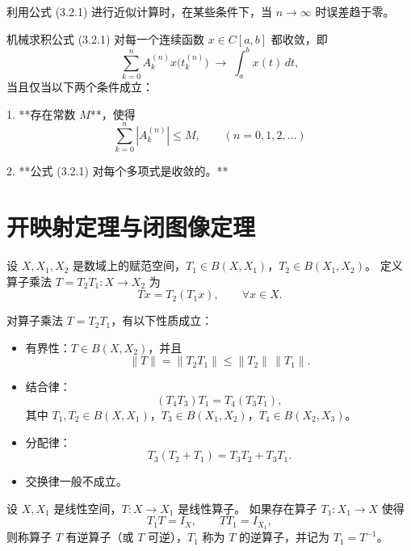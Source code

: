 \begin{theorem}[机械求积公式的收敛性问题]
利用公式 (3.2.1) 进行近似计算时，在某些条件下，当 $n \to \infty$ 时误差趋于零。

机械求积公式 (3.2.1) 对每一个连续函数 $x \in C[a,b]$ 都收敛，即
\[
\sum_{k=0}^{n} A_k^{(n)} x\bigl(t_k^{(n)}\bigr)
\;\longrightarrow\;
\int_a^b x(t)\, dt,
\]
当且仅当以下两个条件成立：

1. **存在常数 $M$**，使得
\[
\sum_{k=0}^n \left|A_k^{(n)}\right| \le M, \qquad (n = 0,1,2,\ldots)
\]

2. **公式 (3.2.1) 对每个多项式是收敛的。**

\end{theorem}
\section{开映射定理与闭图像定理}
\begin{definition}
设 $X, X_1, X_2$ 是数域上的赋范空间，$T_1 \in B(X, X_1)$，$T_2 \in B(X_1, X_2)$。
定义算子乘法 $T = T_2 T_1 : X \to X_2$ 为
\[
T x = T_2(T_1 x), \qquad \forall x \in X.
\]
\end{definition}

\begin{theorem}[算子乘法的性质]
对算子乘法 $T = T_2 T_1$，有以下性质成立：

\begin{itemize}
    \item[(1)] 有界性：$T \in B(X, X_2)$，并且
    \[
    \|T\| = \|T_2 T_1\| \le \|T_2\| \, \|T_1\|.
    \]

    \item[(2)] 结合律：
    \[
    (T_4 T_3) T_1 = T_4 (T_3 T_1),
    \]
    其中 $T_1, T_2 \in B(X, X_1)$，$T_3 \in B(X_1, X_2)$，$T_4 \in B(X_2, X_3)$。

    \item[(3)] 分配律：
    \[
    T_3 (T_2 + T_1) = T_3 T_2 + T_3 T_1.
    \]

    \item[(4)] 交换律一般不成立。
\end{itemize}
\end{theorem}
\begin{definition}[算子的逆运算]
设 $X, X_1$ 是线性空间，$T : X \to X_1$ 是线性算子。
如果存在算子 $T_1 : X_1 \to X$ 使得
\[
T_1 T = I_X, \qquad T T_1 = I_{X_1},
\]
则称算子 $T$ 有逆算子（或 $T$ 可逆），$T_1$ 称为 $T$ 的逆算子，并记为 $T_1 = T^{-1}$。
\end{definition}

